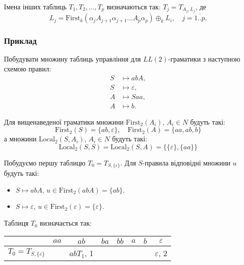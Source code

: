 Імена інших таблиць $T_1, T_2, \ldots, T_p$ визначаються так: $T_j = T_{A_j, L_j}$, де
\begin{equation}
    L_j = \text{First}_k(\alpha_j A_{j + 1} \alpha_{j + 1} \ldots A_p \alpha_p) \oplus_k L_i, \quad j = \overline{1..p}.
\end{equation}

\subsubsection{Приклад}

Побудувати множину таблиць управління для $LL(2)$-граматики з наступною схемою правил:
\setcounter{equation}{0}
\begin{align}
	S &\mapsto abA, \\
	S &\mapsto \varepsilon, \\
	A &\mapsto Saa, \\
	A &\mapsto b.
\end{align}

Для вищенаведеної граматики множини $\text{First}_2(A_i)$, $A_i \in N$ будуть такі:
\begin{equation}
    \text{First}_2(S) = \{ab, \varepsilon\}, \quad \text{First}_2(A) = \{aa, ab, b\}
\end{equation}
а множини $\text{Local}_2(S, A_i)$, $A_i \in N$ будуть такі:
\begin{equation}
    \text{Local}_2(S, S) = \text{Local}_2(S, A) = \{\{\varepsilon\}, \{aa\}\}
\end{equation}

Побудуємо першу таблицю $T_0 = T_{S, \{\varepsilon\}}$. Для $S$-правила відповідні множини $u$ будуть такі:
\begin{itemize}
	\item $S \mapsto abA$, $u \in \text{First}_2(abA) = \{ab\}$.
	\item $S \mapsto \varepsilon$, $u \in \text{First}_2(\varepsilon) = \{\varepsilon\}$.
\end{itemize}

Таблиця $T_0$ визначається так:
\begin{table}[H]
	\centering
	\begin{tabular}{|c|c|c|c|c|c|c|c|}
		\hline
		& $aa$ & $ab$ & $ba$ & $bb$ & $a$ & $b$ & $\varepsilon$ \\ \hline
		$T_0 = T_{S, \{\varepsilon\}}$ &  & $abT_1$, 1 &  &  &  &  & $\varepsilon$, 2 \\ \hline
	\end{tabular}
\end{table}

